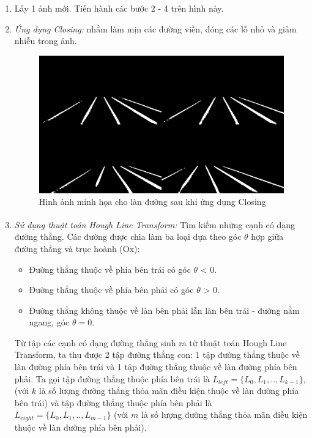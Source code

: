 \begin{enumerate}
    \item Lấy 1 ảnh mới. Tiến hành các bước 2 - 4 trên hình này.
    \item \textit{Ứng dụng Closing:} nhằm làm mịn các đường viền, đóng các lỗ nhỏ và giảm nhiễu trong ảnh.
    \begin{figure}[h]
        \centering
        \includegraphics[width=12cm]{img/4_Implement/backend/closing.jpg}
        \caption{Hình ảnh minh họa cho làn đường sau khi ứng dụng Closing}
    \end{figure}
    \item \textit{Sử dụng thuật toán Hough Line Transform\textsuperscript{\cite{houghtransform}}:} Tìm kiếm những cạnh có dạng đường thẳng. Các đường được chia làm ba loại dựa theo góc  $\theta$ hợp giữa đường thẳng và trục hoành (Ox):
    \begin{itemize}
        \item Đường thẳng thuộc về phía bên trái có góc $\theta$ < 0.
        \item Đường thẳng thuộc về phía bên phải có góc $\theta$ > 0.
        \item Đường thẳng không thuộc về làn bên phải lẫn làn bên trái - đường nằm ngang, góc $\theta = 0$.
    \end{itemize}
    Từ tập các cạnh có dạng đường thẳng sinh ra từ thuật toán Hough Line Transform, ta thu được 2 tập đường thẳng con: 1 tập đường thẳng thuộc về làn đường phía bên trái và 1 tập đường thẳng thuộc về làn đường phía bên phải. Ta gọi tập đường thẳng thuộc phía bên trái là $L_{left} = \{ L_0, L_1,.., L_{k-1}\}$, (với $k$ là số lượng đường thẳng thỏa mãn điều kiện thuộc về làn đường phía bên trái) và tập đường thẳng thuộc phía bên phải là $L_{right} = \{L_0, L_1,.., L_{m-1}\}$ (với $m$ là số lượng đường thẳng thỏa mãn điều kiện thuộc về làn đường phía bên phải).
    \begin{figure}[h]

\end{figure}
\end{enumerate}

